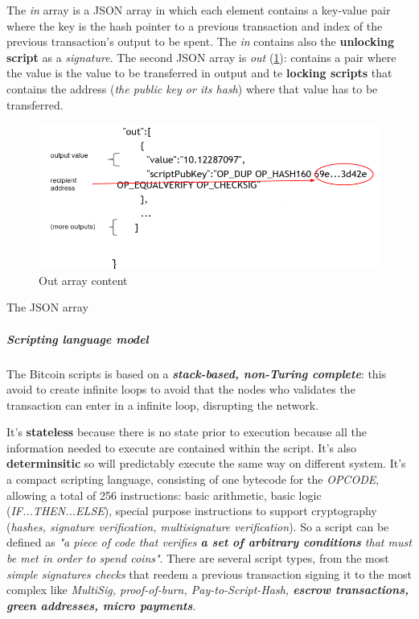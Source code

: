 \documentclass[10pt,a4paper]{report}
\begin{document}
The \textit{in} array is a JSON array in which each element contains a key-value pair where the key is the hash pointer to a previous transaction and index of the previous transaction's output to be spent. The \textit{in} contains also the \textbf{unlocking script} as a \textit{signature}.
The second JSON array is \textit{out} (\ref{out-array}):  contains a pair where the value is the value to be transferred in output and te \textbf{locking scripts} that contains the address (\textit{the public key or its hash}) where that value has to be transferred.
\begin{figure}[h]
	\centering
	\includegraphics[scale=0.50]{images/Pasted image 20230329124024.png}
	\caption{Out array content}
\label{out-array}
\end{figure}

The JSON array

\subparagraph{Scripting language model}\label{sec:scripting-language-model}
The Bitcoin scripts is based on a \textit{\textbf{stack-based, non-Turing complete}}: this avoid to create infinite loops to avoid that the nodes who validates the transaction can enter in a infinite loop, disrupting the network.

It's \textbf{stateless} because there is no state prior to execution because all the information needed to execute are contained within the script.
It's also \textbf{determinsitic} so will predictably execute the same way on different system.
It's a compact scripting language, consisting of one bytecode for the \textit{OPCODE}, allowing a total of 256 instructions: basic arithmetic, basic logic (\textit{IF...THEN...ELSE}), special purpose instructions to support cryptography (\textit{hashes, signature verification, multisignature verification}).
So a script can be defined as \textit{"a piece of code that verifies \textbf{a set of arbitrary conditions} that must be met in order to spend coins"}. There are several script types, from the most \textit{simple signatures checks} that reedem a previous transaction signing it to the most complex like \textit{MultiSig, proof-of-burn, Pay-to-Script-Hash, \textbf{escrow transactions, green addresses, micro payments}.}
\end{document}
